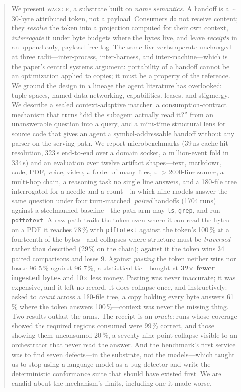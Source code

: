 \documentclass[10pt,twocolumn]{article}
\begin{document}
\begin{abstract}
We present \textsc{waggle}, a substrate built on \emph{name semantics}.
A handoff is a $\sim$30-byte attributed token, not a payload. Consumers
do not receive content; they \emph{resolve} the token into a projection
computed for their own context, \emph{interrogate} it under byte budgets
where the bytes live, and leave \emph{receipts} in an append-only,
payload-free log. The same five verbs operate unchanged at three
radii---inter-process, inter-harness, and inter-machine---which is the
paper's central systems argument: portability of a handoff cannot be an
optimization applied to copies; it must be a property of the reference.
We ground the design in a lineage the agent literature has overlooked:
tuple spaces, named-data networking, capabilities, leases, and
stigmergy. We describe a sealed context-adaptive matcher, a
consumption-contract mechanism that turns ``did the subagent actually
read it?'' from an unanswerable question into a query, and a mint-time
structural lens for source code that gives an agent a symbol-addressable
handoff without any parser on the serving path. We report microbenchmarks
(39\,ns cache-hit resolution, 323\,\textmu{}s end-to-end over a domain
socket, a million-event fold in 334\,\textmu{}s) and an evaluation over twelve
artifact shapes---text, markdown, code, PDF, voice, video, a folder of many
files, a $>$2000-line source, a multi-hop chain, a reasoning task no single line
answers, and a 180-file tree interrogated for a needle and a count---in which nine models answer the same question
under four turn-matched, \emph{paired} handoffs (1704 runs) against a steelmanned
baseline---the path arm may \texttt{ls}, \texttt{grep}, and run \texttt{pdftotext}.
A raw path trails the token even where it can read the bytes---on a PDF it reaches
78\,\% with \texttt{pdftotext} against the token's 100\,\% at a fourteenth of the
bytes---and collapses where structure must be \emph{traversed} rather than described
(29\,\% on the chain); against it the token wins 34 paired comparisons and loses 9.
Against \emph{pasting} the token neither wins nor loses: 96.5\,\% against 96.7\,\%, a
statistical tie---bought at \textbf{32$\times$ fewer ingested bytes} and
10$\times$ less money. Pasting was never inaccurate; it was expensive, and it
left no record. It does collapse once, and instructively: asked to \emph{count}
across a 180-file tree, a copy holding every byte answers 61\,\% where the token
answers 100\,\%---context was never the missing thing. Two results outlast the
arms. The receipt is an \emph{oracle}: runs whose coverage showed the required
regions consumed were 99\,\% correct, and those showing them unconsumed 20\,\%,
a seventy-nine-point collapse visible to an orchestrator that never read the answer.
And the benchmark's first service was to find seven defects---in the substrate,
not the models---which taught us to stop using a language model as a bug
detector and write the deterministic conformance suite that should have existed
first. We are candid about the mechanism's limits, including one it made worse.
\end{abstract}
\end{document}
